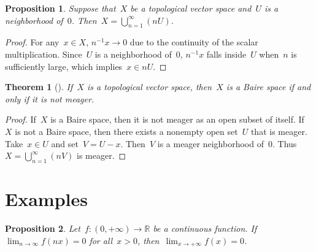 \documentclass[11pt,a4paper]{article}
\newtheorem{theorem}{Theorem}[section]
\newtheorem{proposition}{Proposition}[section]
\theoremstyle{definition}
\def\real{\mathbb{R}}
\numberwithin{equation}{section}
\begin{document}
\begin{proposition}
  Suppose that~$X$ be a topological vector space and~$U$ is a neighborhood of~$0$.
  Then~$X=\bigcup_{n=1}^\infty (nU)$. 
\end{proposition}

\begin{proof}
  For any~$x\in X$, $n^{-1} x\to 0$ due to the continuity of the scalar multiplication. 
  Since~$U$ is a neighborhood of~$0$,
  $n^{-1} x$ falls inside~$U$ when~$n$ is sufficiently large, which implies~$x\in n U$.
\end{proof}

\begin{theorem}[{\cite[Theorem~11.6.7]{Narici_Beckenstein_2010}}]
  If~$X$ is a topological vector space, then~$X$ is a Baire space if and only if it is not meager. 
\end{theorem}

\begin{proof}
 If~$X$ is a Baire space, then it is not meager as an open subset of itself.  If~$X$ is not a Baire
 space, then there exists a nonempty open set~$U$ that is meager. Take~$x\in U$ and set~$V=U-x$.
 Then~$V$ is a meager neighborhood of~$0$. Thus~$X=\bigcup_{n=1}^\infty (nV)$ is meager. 
\end{proof}

\section{Examples}

\begin{proposition}
  Let~$f\mathrel{:} (0,+\infty)\to \real$ be a continuous function. If~$\lim_{n\to \infty}f(nx) = 0$ 
   for all~$x>0$, then~$\lim_{x\to +\infty} f(x) = 0$.
\end{proposition}
\end{document}
